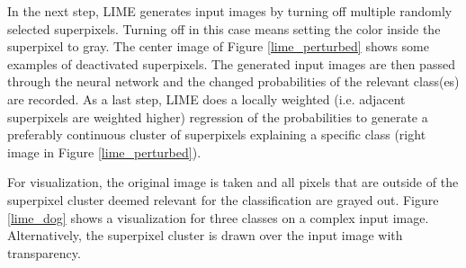 In the next step, LIME generates input images by turning off multiple randomly selected superpixels. Turning off in this case means setting the color inside the superpixel to gray. The center image of Figure \ref{lime_perturbed} shows some examples of deactivated superpixels. The generated input images are then passed through the neural network and the changed probabilities of the relevant class(es) are recorded. As a last step, LIME does a locally weighted (i.e. adjacent superpixels are weighted higher) regression of the probabilities to generate a preferably continuous cluster of superpixels explaining a specific class (right image in Figure \ref{lime_perturbed}).

For visualization, the original image is taken and all pixels that are outside of the superpixel cluster deemed relevant for the classification are grayed out.
Figure \ref{lime_dog} shows a visualization for three classes on a complex input image. Alternatively, the superpixel cluster is drawn over the input image with transparency.

